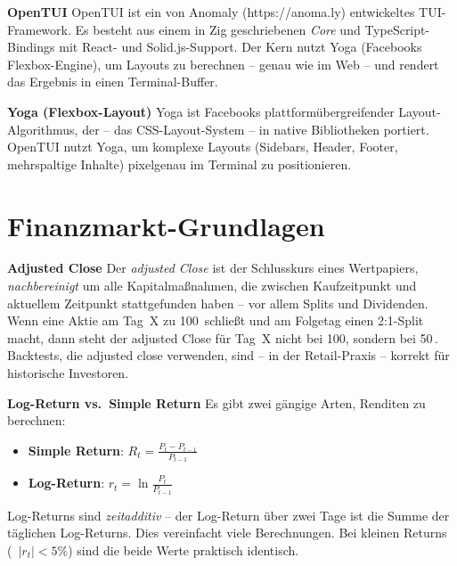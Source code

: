 \begin{definition}
\textbf{OpenTUI}
OpenTUI ist ein von Anomaly (https://anoma.ly) entwickeltes
TUI-Framework. Es besteht aus einem in Zig geschriebenen
\emph{Core} und TypeScript-Bindings mit React- und Solid.js-Support.
Der Kern nutzt Yoga (Facebooks Flexbox-Engine), um Layouts zu
berechnen -- genau wie im Web -- und rendert das Ergebnis in einen
Terminal-Buffer.
\end{definition}

\begin{definition}
\textbf{Yoga (Flexbox-Layout)}
Yoga ist Facebooks plattformübergreifender Layout-Algorithmus, der
 -- das CSS-Layout-System -- in native Bibliotheken
portiert. OpenTUI nutzt Yoga, um komplexe Layouts (Sidebars,
Header, Footer, mehrspaltige Inhalte) pixelgenau im Terminal zu
positionieren.
\end{definition}

\section{Finanzmarkt-Grundlagen}

\begin{definition}
\textbf{Adjusted Close}
Der \emph{adjusted Close} ist der Schlusskurs eines Wertpapiers,
\emph{nachbereinigt} um alle Kapitalmaßnahmen, die zwischen
Kaufzeitpunkt und aktuellem Zeitpunkt stattgefunden haben -- vor
allem Splits und Dividenden. Wenn eine Aktie am Tag~X zu 100\,{}
schließt und am Folgetag einen 2:1-Split macht, dann steht der
adjusted Close für Tag~X nicht bei 100, sondern bei 50\,{}.
Backtests, die adjusted close verwenden, sind -- in der Retail-Praxis
-- korrekt für historische Investoren.
\end{definition}

\begin{definition}
\textbf{Log-Return vs.\ Simple Return}
Es gibt zwei gängige Arten, Renditen zu berechnen:

\begin{itemize}
  \item \textbf{Simple Return}: $R_t = \frac{P_t - P_{t-1}}{P_{t-1}}$
  \item \textbf{Log-Return}: $r_t = \ln\frac{P_t}{P_{t-1}}$
\end{itemize}

Log-Returns sind \emph{zeitadditiv} -- der Log-Return über zwei
Tage ist die Summe der täglichen Log-Returns. Dies vereinfacht
viele Berechnungen. Bei kleinen Returns (~$|r_t| < 5\%$) sind die
beide Werte praktisch identisch.
\end{definition}

